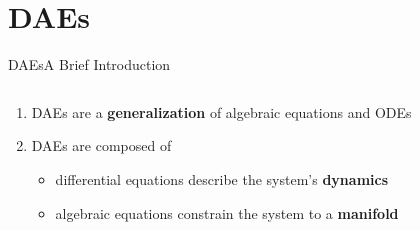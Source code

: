 
\section{\aclp{DAE}}

\begin{frame}{\aclp{DAE}}{A Brief Introduction}
  \begin{columns}
    \begin{column}{0.65\textwidth}
      \begin{enumerate}[<+->]
        \item \acsp{DAE} are a \textbf{generalization} of algebraic equations and \acsp{ODE} \\
        \item \acsp{DAE} are composed of
        \begin{itemize}
          \item<2-> differential equations describe the system's \textbf{dynamics}
          \item<2-> algebraic equations constrain the system to a \textbf{manifold} \\
        \end{itemize}
      \end{enumerate}
    \end{column}
    \begin{column}{0.35\textwidth}

\end{column}
\end{columns}
\end{frame}
